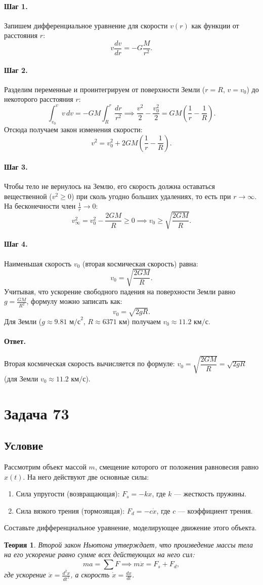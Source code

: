 \documentclass[12pt,a4paper]{article}
\theoremstyle{solution}
\newtheorem*{theory}{Теория}
\newcommand{\task}[1]{\newpage\section*{Задача #1}}
\newcommand{\answer}{\paragraph{Ответ.}}
\newcommand{\step}[1]{\paragraph{Шаг #1.}}
\begin{document}
\step{1} Запишем дифференциальное уравнение для скорости $v(r)$ как функции от расстояния $r$:
\[
v \frac{dv}{dr} = -G \frac{M}{r^2}.
\]

\step{2} Разделим переменные и проинтегрируем от поверхности Земли ($r = R$, $v = v_0$) до некоторого расстояния $r$:
\[
\int_{v_0}^v v\,dv = -GM \int_R^r \frac{dr}{r^2} \implies \frac{v^2}{2} - \frac{v_0^2}{2} = GM \left( \frac{1}{r} - \frac{1}{R} \right).
\]
Отсюда получаем закон изменения скорости:
\[
v^2 = v_0^2 + 2GM \left( \frac{1}{r} - \frac{1}{R} \right).
\]

\step{3} Чтобы тело не вернулось на Землю, его скорость должна оставаться вещественной ($v^2 \geq 0$) при сколь угодно больших удалениях, то есть при $r \to \infty$. На бесконечности член $\frac{1}{r} \to 0$:
\[
v_{\infty}^2 = v_0^2 - \frac{2GM}{R} \geq 0 \implies v_0 \geq \sqrt{\frac{2GM}{R}}.
\]

\step{4} Наименьшая скорость $v_0$ (вторая космическая скорость) равна:
\[
v_0 = \sqrt{\frac{2GM}{R}}.
\]
Учитывая, что ускорение свободного падения на поверхности Земли равно $g = \frac{GM}{R^2}$, формулу можно записать как:
\[
v_0 = \sqrt{2gR}.
\]
Для Земли ($g \approx 9.81 \text{ м/с}^2$, $R \approx 6371 \text{ км}$) получаем $v_0 \approx 11.2 \text{ км/с}$.

\answer
Вторая космическая скорость вычисляется по формуле: $v_0 = \sqrt{\dfrac{2GM}{R}} = \sqrt{2gR}$ (для Земли $v_0 \approx 11.2 \text{ км/с}$).

\task{73}
\subsection*{Условие}
Рассмотрим объект массой $m$, смещение которого от положения равновесия равно $x(t)$. На него действуют две основные силы:
\begin{enumerate}
    \item Сила упругости (возвращающая): $F_s = -kx$, где $k$ — жесткость пружины.
    \item Сила вязкого трения (тормозящая): $F_d = -c\dot{x}$, где $c$ — коэффициент трения.
\end{enumerate}
Составьте дифференциальное уравнение, моделирующее движение этого объекта.

\begin{theory}
Второй закон Ньютона утверждает, что произведение массы тела на его ускорение равно сумме всех действующих на него сил:
\[
m a = \sum F \implies m \ddot{x} = F_s + F_d,
\]
где ускорение $\ddot{x} = \frac{d^2 x}{dt^2}$, а скорость $\dot{x} = \frac{dx}{dt}$.
\end{theory}
\end{document}
